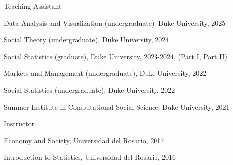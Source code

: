 \documentclass[11pt,article,oneside]{memoir}
\begin{document}
\bigskip


\medskip

\ind Teaching Assistant

\ind \hspace{0.35in} \footnotesize \textemdash Data Analysis and Visualization (undergraduate), Duke University, 2025

\ind \hspace{0.35in} \footnotesize \textemdash Social Theory (undergraduate), Duke University, 2024

\ind \hspace{0.35in} \textemdash Social Statistics (graduate), Duke University, 2023-2024, (\href{https://acastroaraujo.github.io/socStats/}{Part I}, \href{https://acastroaraujo.github.io/socStats2/}{Part II})

\ind \hspace{0.35in} \textemdash Markets and Management (undergraduate), Duke University, 2022

\ind \hspace{0.35in} \textemdash Social Statistics (undergraduate), Duke University, 2022

\ind \hspace{0.35in} \textemdash Summer Institute in Computational Social Science, Duke University, 2021

\normalsize \ind Instructor 

\footnotesize

\ind \hspace{0.35in} \textemdash Economy and Society, Universidad del Rosario, 2017

\ind \hspace{0.35in} \textemdash Introduction to Statistics, Universidad del Rosario, 2016

\normalsize

\bigskip


\medskip
\end{document}
